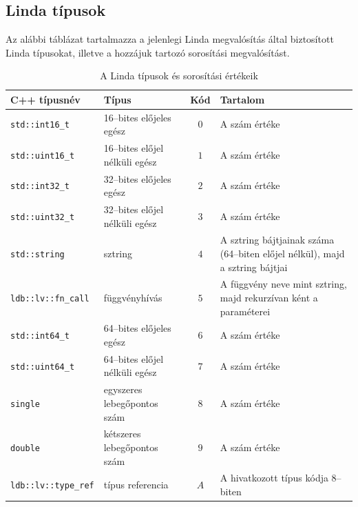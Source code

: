 
\appendix
\chapter*{\fuggelek}
\setcounter{chapter}{\appendixnumber}
%
\section{Linda típusok}

Az alábbi táblázat tartalmazza a jelenlegi Linda megvalósítás által biztosított Linda típusokat, illetve a hozzájuk tartozó sorosítási megvalósítást.

\begin{table}[h!]
    \begin{tabularx}{\linewidth}{|l|l||c|X|}
        \hline
        \textbf{C++ típusnév} & \textbf{Típus} & \textbf{Kód} & \textbf{Tartalom} \\
        \hline
        \texttt{std::int16\_t} & 16--bites előjeles egész & $0$ & A szám értéke \\\hline
        \texttt{std::uint16\_t} & 16--bites előjel nélküli egész & $1$ & A szám értéke \\\hline
        \texttt{std::int32\_t} & 32--bites előjeles egész & $2$ & A szám értéke \\\hline
        \texttt{std::uint32\_t} & 32--bites előjel nélküli egész & $3$ & A szám értéke \\\hline
        \texttt{std::string} & sztring & $4$ & A sztring bájtjainak száma (64--biten előjel nélkül), majd a sztring bájtjai \\\hline
        \texttt{ldb::lv::fn\_call} & függvényhívás & $5$ & A függvény neve mint sztring, majd rekurzívan \nes{}ként a paraméterei \\\hline
        \texttt{std::int64\_t} & 64--bites előjeles egész & $6$ & A szám értéke \\\hline
        \texttt{std::uint64\_t} & 64--bites előjel nélküli egész & $7$ & A szám értéke \\\hline
        \texttt{single} & egyszeres lebegőpontos szám & $8$ & A szám értéke \\\hline
        \texttt{double} & kétszeres lebegőpontos szám & $9$ & A szám értéke \\\hline
        \texttt{ldb::lv::type\_ref} & típus referencia & $A$ & A hivatkozott típus kódja 8--biten \\\hline
    \end{tabularx}
    \caption{A Linda típusok és sorosítási értékeik}
    \label{tbl:type-serial}
\end{table}

